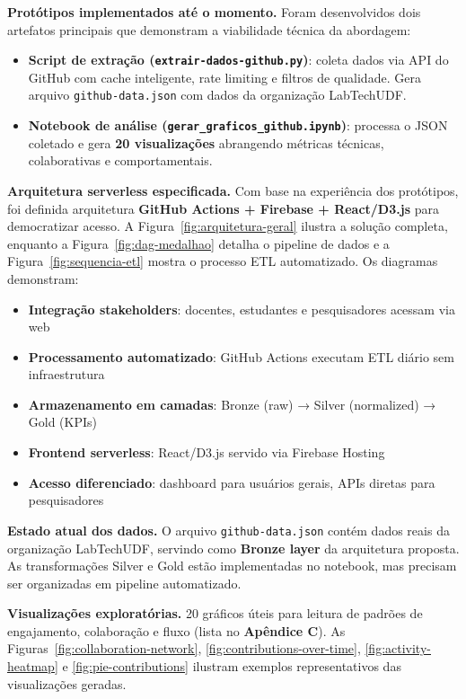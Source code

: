 \documentclass[
	12pt,
	openright,
	oneside,
	a4paper,
	brazil
]{abntex2}
\begin{document}
\textbf{Protótipos implementados até o momento.} 
Foram desenvolvidos dois artefatos principais que demonstram a viabilidade técnica da abordagem:
\begin{itemize}
    \item \textbf{Script de extração (\texttt{extrair-dados-github.py})}: coleta dados via API do GitHub com cache inteligente, rate limiting e filtros de qualidade. Gera arquivo \texttt{github-data.json} com dados da organização LabTechUDF.
    \item \textbf{Notebook de análise (\texttt{gerar\_graficos\_github.ipynb})}: processa o JSON coletado e gera \textbf{20 visualizações} abrangendo métricas técnicas, colaborativas e comportamentais.
\end{itemize}

\textbf{Arquitetura serverless especificada.} Com base na experiência dos protótipos, foi definida arquitetura \textbf{GitHub Actions + Firebase + React/D3.js} para democratizar acesso. A Figura~\ref{fig:arquitetura-geral} ilustra a solução completa, enquanto a Figura~\ref{fig:dag-medalhao} detalha o pipeline de dados e a Figura~\ref{fig:sequencia-etl} mostra o processo ETL automatizado. Os diagramas demonstram:
\begin{itemize}
    \item \textbf{Integração stakeholders}: docentes, estudantes e pesquisadores acessam via web
    \item \textbf{Processamento automatizado}: GitHub Actions executam ETL diário sem infraestrutura
    \item \textbf{Armazenamento em camadas}: Bronze (raw) → Silver (normalized) → Gold (KPIs)
    \item \textbf{Frontend serverless}: React/D3.js servido via Firebase Hosting
    \item \textbf{Acesso diferenciado}: dashboard para usuários gerais, APIs diretas para pesquisadores
\end{itemize}

\textbf{Estado atual dos dados.} O arquivo \texttt{github-data.json} contém dados reais da organização LabTechUDF, servindo como \textbf{Bronze layer} da arquitetura proposta. As transformações Silver e Gold estão implementadas no notebook, mas precisam ser organizadas em pipeline automatizado.

\textbf{Visualizações exploratórias.} 20 gráficos úteis para leitura de padrões de engajamento, colaboração e fluxo (lista no \textbf{Apêndice C}). As Figuras~\ref{fig:collaboration-network}, \ref{fig:contributions-over-time}, \ref{fig:activity-heatmap} e \ref{fig:pie-contributions} ilustram exemplos representativos das visualizações geradas. 
\end{document}
